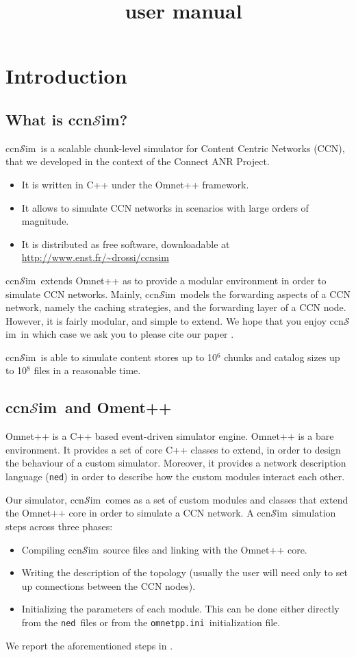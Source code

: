 \documentclass{book}
\title{\ccnsim\ user manual}
\newcommand{\ccnsim}{ccn$\mathcal{S}$im}
\newcommand{\ned}{\texttt{ned}}
\newcommand{\ini}{\texttt{omnetpp.ini}}
\begin{document}
\maketitle
\tableofcontents
\newpage
\section{Introduction}
\subsection{What is \ccnsim?}
\ccnsim\ is a scalable chunk-level simulator for Content Centric Networks (CCN)\cite{jacobson09conext}, that we developed in the context of the Connect  ANR Project.

\begin{itemize}
    \item It is written in C++ under the Omnet++ framework.
    \item It  allows to simulate CCN networks in scenarios with large orders of magnitude.
    \item It is distributed as free software, downloadable at \url{http://www.enst.fr/~drossi/ccnsim}
\end{itemize}

\ccnsim\ extends Omnet++ as to provide a modular environment in order to simulate CCN networks. Mainly,  \ccnsim\ models the forwarding aspects of a CCN network, namely the caching strategies, and the forwarding layer of a CCN node. However, it is fairly modular, and simple to extend. We hope that you enjoy \ccnsim\, in which case we ask you to please cite our paper \cite{ccn12icc}. 

\ccnsim\ is able to simulate content stores up to 10$^6$ chunks and catalog sizes up to 10$^8$ files in a reasonable time.  

\subsection{\ccnsim\ and Oment++}
Omnet++ is a C++ based event-driven simulator engine. Omnet++ is a bare environment. It provides a set of core C++ classes to extend, in order to design the behaviour of a custom simulator.  Moreover, it provides a network description language (\verb|ned|) in order to describe how the custom modules interact each other. 

Our simulator, \ccnsim\ comes as a set of custom modules and classes that extend the Omnet++ core in order to simulate a CCN network. A \ccnsim\ simulation steps across three phases:  
\begin{itemize}
    \item Compiling  \ccnsim\ source files and linking with the Omnet++ core.
    \item Writing  the description of the topology (usually the user will need only to set up connections between the CCN nodes).
    \item Initializing the  parameters of each module. This can be done either directly from the \ned\ files or from the \ini\ initialization file. 
\end{itemize}
We report the aforementioned steps in .
\end{document}
